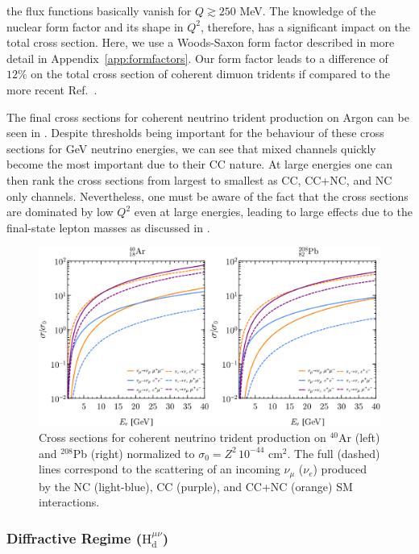 the flux functions basically vanish for $Q\gtrsim 250$ MeV. The knowledge of the nuclear form factor and its shape in $Q^2$, therefore, has a significant impact on the total cross section. Here, we use a Woods-Saxon form factor described in more detail in Appendix~\ref{app:formfactors}. Our form factor leads to a difference of $12\%$ on the total cross section of coherent dimuon tridents if compared to the more recent Ref.~\cite{Altmannshofer:2019zhy}.

The final cross sections for coherent neutrino trident production on Argon can be seen in . Despite thresholds being important for the behaviour of these cross sections for GeV neutrino energies, we can see that mixed channels quickly become the most important due to their CC nature. At large energies one can then rank the cross sections from largest to smallest as CC, CC+NC, and NC only channels. Nevertheless, one must be aware of the fact that the cross sections are dominated by low $Q^2$ even at large energies, leading to large effects due to the final-state lepton masses as discussed in \cite{Magill:2016hgc}.

%
\begin{figure}[t]
\centering
\includegraphics[width=\textwidth]{figs/Xsec_4PS_coh.pdf}
\caption[Coherent neutrino trident production total cross sections.]{Cross sections for coherent neutrino trident production on $^{40}$Ar (left) and  $^{208}$Pb (right) normalized to $\sigma_0 =  Z^2\, 10^{-44}$ cm$^2$. The full (dashed) lines correspond to the scattering of an incoming $\nu_\mu$ ($\nu_e$) produced by the NC (light-blue), CC (purple), and CC+NC (orange) SM interactions. \label{fig:coh_xsec}}
\end{figure}
%

\subsubsection{Diffractive Regime ($\mathrm{H}^{\mu\nu}_\mathrm{d}$)}

